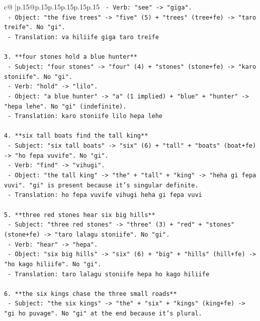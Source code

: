 \documentclass{article}
\begin{document}
{\begin{supertabular}{c@{$\;$}|p{.15\linewidth}@{}p{.15\linewidth}p{.15\linewidth}p{.15\linewidth}p{.15\linewidth}p{.15\linewidth}}
{{{\texttt{   {-} Verb: "see" {-}> "giga".} \\
\texttt{   {-} Object: "the five trees" {-}> "five" (5) + "trees" (tree+fe) {-}> "taro treife". No "gi".} \\
\texttt{   {-} Translation: va hiliife giga taro treife} \\
\\ 
\texttt{3. **four stones hold a blue hunter**} \\
\texttt{   {-} Subject: "four stones" {-}> "four" (4) + "stones" (stone+fe) {-}> "karo stoniife". No "gi".} \\
\texttt{   {-} Verb: "hold" {-}> "lilo".} \\
\texttt{   {-} Object: "a blue hunter" {-}> "a" (1 implied) + "blue" + "hunter" {-}> "hepa lehe". No "gi" (indefinite).} \\
\texttt{   {-} Translation: karo stoniife lilo hepa lehe} \\
\\ 
\texttt{4. **six tall boats find the tall king**} \\
\texttt{   {-} Subject: "six tall boats" {-}> "six" (6) + "tall" + "boats" (boat+fe) {-}> "ho fepa vuvife". No "gi".} \\
\texttt{   {-} Verb: "find" {-}> "vihugi".} \\
\texttt{   {-} Object: "the tall king" {-}> "the" + "tall" + "king" {-}> "heha gi fepa vuvi". "gi" is present because it's singular definite.} \\
\texttt{   {-} Translation: ho fepa vuvife vihugi heha gi fepa vuvi} \\
\\ 
\texttt{5. **three red stones hear six big hills**} \\
\texttt{   {-} Subject: "three red stones" {-}> "three" (3) + "red" + "stones" (stone+fe) {-}> "taro lalagu stoniife". No "gi".} \\
\texttt{   {-} Verb: "hear" {-}> "hepa".} \\
\texttt{   {-} Object: "six big hills" {-}> "six" (6) + "big" + "hills" (hill+fe) {-}> "ho kago hiliife". No "gi".} \\
\texttt{   {-} Translation: taro lalagu stoniife hepa ho kago hiliife} \\
\\ 
\texttt{6. **the six kings chase the three small roads**} \\
\texttt{   {-} Subject: "the six kings" {-}> "the" + "six" + "kings" (king+fe) {-}> "gi ho puvage". No "gi" at the end because it's plural.} \\
}}}
\end{supertabular}}
\end{document}
